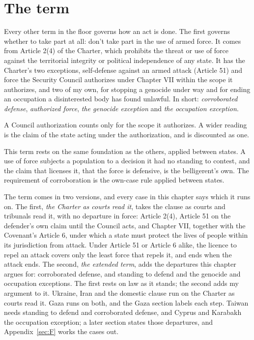 \section{The term}
\label{sec:6.1}
Every other term in the floor governs how an act is done. The first governs whether to take part at all: don't take part in the use of armed force. It comes from Article 2(4) of the Charter, which prohibits the threat or use of force against the territorial integrity or political independence of any state. It has the Charter's two exceptions, self-defense against an armed attack (Article 51) and force the Security Council authorizes under Chapter VII within the scope it authorizes, and two of my own, for stopping a genocide under way and for ending an occupation a disinterested body has found unlawful. In short: \emph{corroborated defense}, \emph{authorized force}, \emph{the genocide exception} and \emph{the occupation exception}.

A Council authorization counts only for the scope it authorizes. A wider reading is the claim of the state acting under the authorization, and is discounted as one.

This term rests on the same foundation as the others, applied between states. A use of force subjects a population to a decision it had no standing to contest, and the claim that licenses it, that the force is defensive, is the belligerent's own. The requirement of corroboration is the own-case rule applied between states.

The term comes in two versions, and every case in this chapter says which it runs on. The first, \emph{the Charter as courts read it}, takes the clause as courts and tribunals read it, with no departure in force: Article 2(4), Article 51 on the defender's own claim until the Council acts, and Chapter VII, together with the Covenant's Article 6, under which a state must protect the lives of people within its jurisdiction from attack. Under Article 51 or Article 6 alike, the licence to repel an attack covers only the least force that repels it, and ends when the attack ends. The second, \emph{the extended term}, adds the departures this chapter argues for: corroborated defense, and standing to defend and the genocide and occupation exceptions. The first rests on law as it stands; the second adds my argument to it. Ukraine, Iran and the domestic clause run on the Charter as courts read it. Gaza runs on both, and the Gaza section labels each step. Taiwan needs standing to defend and corroborated defense, and Cyprus and Karabakh the occupation exception; a later section states those departures, and Appendix~\ref{sec:F} works the cases out.
